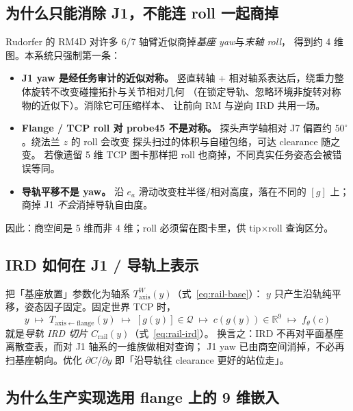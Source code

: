 \documentclass[UTF8,a4paper,11pt,fontset=fandol]{ctexart}
\newcommand{\R}{\mathbb{R}}
\newcommand{\Taxis}{T_{\mathrm{axis}}}
\begin{document}
\subsection{为什么只能消除 J1，不能连 roll 一起商掉}
\label{sec:why-only-j1}

Rudorfer 的 RM4D 对许多 6/7 轴臂近似商掉\emph{基座 yaw}与\emph{末轴 roll}，
得到约 4 维图。本系统只强制第一条：

\begin{itemize}[leftmargin=1.4em]
  \item \textbf{J1 yaw 是经任务审计的近似对称。}
        竖直转轴 + 相对轴系表达后，绕重力整体旋转不改变碰撞拓扑与关节相对几何
        （在锁定导轨、忽略环境非旋转对称物的近似下）。消除它可压缩样本、
        让前向 RM 与逆向 IRD 共用一场。
  \item \textbf{Flange / TCP roll 对 probe45 不是对称。}
        探头声学轴相对 J7 偏置约 \(50^{\circ}\)。绕法兰 \(z\) 的 roll 会改变
        探头扫过的体积与自碰包络，可达 clearance 随之变。
        若像遗留 5 维 TCP 图卡那样把 roll 也商掉，不同真实任务姿态会被错误等同。
  \item \textbf{导轨平移不是 yaw。}
        沿 \(e_{a}\) 滑动改变柱半径/相对高度，落在不同的 \([g]\) 上；
        商掉 J1 \emph{不会}消掉导轨自由度。
\end{itemize}

因此：商空间是 5 维而非 4 维；roll 必须留在图卡里，供 tip$\times$roll 查询区分。

\subsection{IRD 如何在 J1 / 导轨上表示}
\label{sec:ird-on-j1}

把「基座放置」参数化为轴系 \(\Taxis^{W}(y)\)（式~\eqref{eq:rail-base}）：
\(y\) 只产生沿轨纯平移，姿态因子固定。固定世界 TCP 时，
\[
  y \;\mapsto\; T_{\mathrm{axis\leftarrow flange}}(y)
  \;\mapsto\; [g(y)]\in\mathcal{Q}
  \;\mapsto\; c(g(y))\in\R^{9}
  \;\mapsto\; f_{\theta}(c)
\]
就是\emph{导轨 IRD 切片} \(C_{\mathrm{rail}}(y)\)（式~\eqref{eq:rail-ird}）。
换言之：IRD 不再对平面基座离散查表，而对 J1 轴系的一维族做相对查询；
J1 yaw 已由商空间消掉，不必再扫基座朝向。优化 \(\partial C/\partial y\)
即「沿导轨往 clearance 更好的站位走」。

\subsection{为什么生产实现选用 flange 上的 9 维嵌入}
\label{sec:why-flange-9d}
\end{document}

